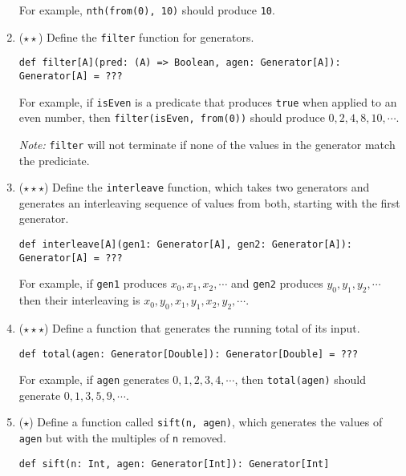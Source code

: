 \documentclass[9pt]{extbook}
\begin{document}
\begin{enumerate}
  For example, \lstinline|nth(from(0), 10)| should produce \lstinline|10|.

\item ($\star\star$) Define the \lstinline|filter| function for generators.
\begin{lstlisting}
def filter[A](pred: (A) => Boolean, agen: Generator[A]): Generator[A] = ???
\end{lstlisting}

  For example, if \lstinline|isEven| is a predicate that produces 
  \lstinline|true| when applied to an even number, then
  \lstinline|filter(isEven, from(0))| should produce $0, 2, 4, 8, 10, \cdots$.

  \emph{Note:} \lstinline|filter| will not terminate if none of the values in
  the generator match the prediciate.

  \item ($\star\star\star$)
  Define the \lstinline|interleave| function, which takes two generators
  and generates an interleaving sequence of values from both, starting with
  the first generator.

\begin{lstlisting}
def interleave[A](gen1: Generator[A], gen2: Generator[A]): Generator[A] = ???
\end{lstlisting}

  For example, if \lstinline|gen1| produces $x_0, x_1, x_2, \cdots$ and \lstinline|gen2|
  produces $y_0, y_1, y_2, \cdots$ then their interleaving is $x_0, y_0, x_1, y_1, x_2, y_2, \cdots$.


  \item ($\star\star\star$) Define a function that generates the running total
  of its input.
  
\begin{lstlisting}
def total(agen: Generator[Double]): Generator[Double] = ???
\end{lstlisting}

  For example, if \lstinline|agen| generates $0, 1, 2, 3, 4, \cdots$, 
  then \lstinline|total(agen)| should
  generate $0, 1, 3, 5, 9, \cdots$.
  
\item ($\star$) Define a function called \lstinline|sift(n, agen)|, which
generates the values of \lstinline|agen| but with the multiples of \lstinline|n|
removed.

\begin{lstlisting}
def sift(n: Int, agen: Generator[Int]): Generator[Int]
\end{lstlisting}



\end{enumerate}
\end{document}
